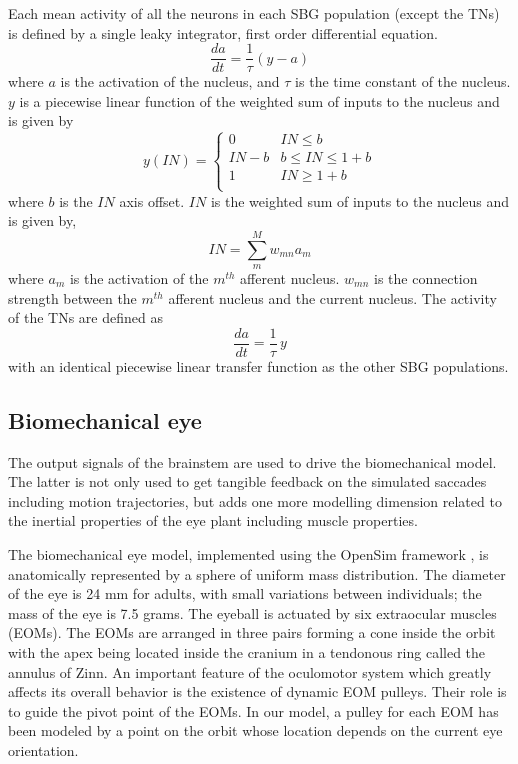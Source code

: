 \documentclass{frontiersSCNS}
\begin{document}
Each mean activity of all the neurons in each SBG population (except
the TNs) is defined by a single leaky integrator, first order
differential equation.
\begin{equation}\label{eq:LIN}
   \frac{da}{dt} = \frac{1}{\tau}(y-a)
\end{equation}
where $a$ is the activation of the nucleus, and $\tau$ is the time
constant of the nucleus. $y$ is a piecewise linear function of the
weighted sum of inputs to the nucleus and is given by
\begin{equation}
       y(IN) = \begin{cases}
       0    & IN \leq b \\
      IN-b   & b \leq IN \leq 1+b \\
      1   & IN \geq 1+b \\
   \end{cases}
\end{equation}
where $b$ is the $IN$ axis offset.  $IN$ is the weighted sum of inputs
to the nucleus and is given by,
\begin{equation}
    IN = \sum_{m}^{M} w_{mn} a_{m}
\end{equation}
where $a_{m}$ is the activation of the $m^{th}$ afferent nucleus.
$w_{mn}$ is the connection strength between the $m^{th}$ afferent
nucleus and the current nucleus. The activity of the TNs are defined
as
\begin{equation}
   \frac{da}{dt} = \frac{1}{\tau}\,y
\end{equation}
with an identical piecewise linear transfer function as the other SBG
populations.

\subsection{Biomechanical eye} \label{sec:methods:eye}

The output signals of the brainstem are used to drive the
biomechanical model.  The latter is not only used to get tangible
feedback on the simulated saccades including motion trajectories, but
adds one more modelling dimension related to the inertial properties
of the eye plant including muscle properties.

The biomechanical eye model, implemented using the OpenSim framework
\citep{seth_opensim:_2011}, is anatomically represented by a sphere of
uniform mass distribution. The diameter of the eye is 24 mm for
adults, with small variations between individuals; the mass of the eye
is 7.5 grams.  The eyeball is actuated by six extraocular muscles
(EOMs). The EOMs are arranged in three pairs forming a cone inside the
orbit with the apex being located inside the cranium in a tendonous
ring called the annulus of Zinn. An important feature of the
oculomotor system which greatly affects its overall behavior is the
existence of dynamic EOM pulleys. Their role is to guide the pivot
point of the EOMs. In our model, a pulley for each EOM has been
modeled by a point on the orbit whose location depends on the current
eye orientation.
\end{document}
